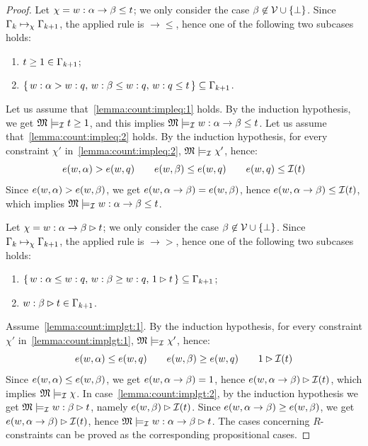\begin{proof}
 
 Let $\chi= w:\alpha\to \beta \leq t$; we only consider the case
 $\beta\not\in\mathcal{V}\cup\{\bot\}$.  Since $\Gamma_k\mapsto_\chi \Gamma_{k+1}$, the
 applied rule is $\to\leq$, hence one of the following two subcases
 holds:
 
 \begin{enumerate}[label=(B\arabic*), ref=(B\arabic*),leftmargin=*]
 \item\label{lemma:count:impleq:1}
   $t\geq 1\in \Gamma_{k+1}$;
   
 \item\label{lemma:count:impleq:2}
   $\{\,w:\alpha> w :q,\,w:\beta\leq w:q,\,w:q\leq t\,\} \subseteq \Gamma_{k+1}$.
 \end{enumerate}
 Let us assume that~\ref{lemma:count:impleq:1} holds.  By the
 induction hypothesis, we get $\mathfrak{M}\models_{\mathcal{I}} t\geq 1$, and this
 implies $\mathfrak{M}\models_{\mathcal{I}} w:\alpha\to \beta \leq t$.  Let us assume
 that~\ref{lemma:count:impleq:2} holds.  By the induction hypothesis,
 for every constraint $\chi'$ in~\ref{lemma:count:impleq:2},
 $\mathfrak{M}\models_{\mathcal{I}} \chi'$, hence:
 \[
 e(w,\alpha) > e(w,q) \qquad e(w,\beta) \leq e(w,q) \qquad e(w,q) \leq \mathcal{I}(t)
 \]  
 Since $e(w,\alpha) > e(w,\beta)$, we get $e(w,\alpha\to \beta) = e(w,\beta)$, hence
 $e(w,\alpha\to \beta) \leq \mathcal{I}(t)$, which implies $\mathfrak{M}\models_{\mathcal{I}} w:\alpha\to
 \beta \leq t$.


 Let $\chi= w:\alpha\to \beta \rhd t$; we only consider the case
 $\beta\not\in\mathcal{V}\cup\{\bot\}$.  Since $\Gamma_k\mapsto_\chi \Gamma_{k+1}$, the
 applied rule is $\to\gt$, hence one of the following two subcases
 holds:
 
 \begin{enumerate}[label=(C\arabic*), ref=(C\arabic*),leftmargin=*]
 \item\label{lemma:count:implgt:1}
   $\{\,w:\alpha \leq w:q,\,w:\beta\geq  w:q,\,1\rhd t\,\}\subseteq\Gamma_{k+1}$;
   
 \item\label{lemma:count:implgt:2}
   $w:\beta\rhd t\in\Gamma_{k+1}$.
 \end{enumerate}
 
 \noindent
 Assume~\ref{lemma:count:implgt:1}.  By the induction hypothesis, for
 every constraint $\chi'$ in~\ref{lemma:count:implgt:1},
 $\mathfrak{M}\models_{\mathcal{I}} \chi'$, hence:
 \[
 e(w,\alpha) \leq  e(w,q) \qquad e(w,\beta) \geq e(w,q) \qquad 1 \rhd \mathcal{I}(t)
 \]  
 Since $e(w,\alpha)\leq e(w,\beta)$, we get $e(w,\alpha\to \beta)=1$, hence
 $e(w,\alpha\to \beta)\rhd \mathcal{I}(t)$, which implies $\mathfrak{M}\models_{\mathcal{I}}\chi$.  In
 case~\ref{lemma:count:implgt:2}, by the induction hypothesis we get
 $\mathfrak{M}\models_{\mathcal{I}} w:\beta\rhd t$, namely $e(w,\beta)\rhd\mathcal{I}(t)$.  Since
 $e(w,\alpha\to\beta)\geq e(w,\beta)$, we get $e(w,\alpha\to\beta)\rhd\mathcal{I}(t)$, hence
 $\mathfrak{M}\models_{\mathcal{I}} w:\alpha\to \beta \rhd t$.  The cases concerning
 $R$-constraints can be proved as the corresponding propositional
 cases.



\end{proof}
